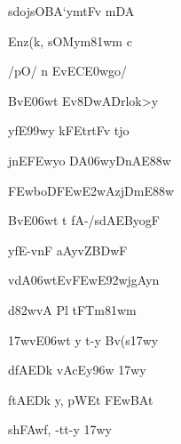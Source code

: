 \ujvers\dnnemsloka 
{\dn sdojsOBA`ymtFv m\?DA}
\dontdisplaylinenum

\dnnemslokab 
{\dn Enz(k, sOMym\381wm\2 c \dandadn\dontdisplaylinenum}

\dnnemslokac 
{\dn {}/pO/\2 n EvEC\3E0wgo/}
\dontdisplaylinenum

\dnnemslokad 
{\dn BvE\306wt Ev\38DwADrlok>y \vegdn\dontdisplaylinenum}


\ujvers\dnnemsloka 
{\dn yfE\399wy\2 kFEt\0rtFv t\?jo}
\dontdisplaylinenum

\dnnemslokab 
{\dn jnE\3FEwyo DA\306wyDnAE\388w \dandadn\dontdisplaylinenum}

\dnnemslokac 
{\dn \3FEwboD\3FEw\3E2wAzjDm\0E\388w}
\dontdisplaylinenum

\dnnemslokad 
{\dn BvE\306wt t\2 fA-/sdAEByogF \vegdn\dontdisplaylinenum}


\ujvers\dnnemsloka 
{\dn yfE-vnF aAy\0vZ\0\3BDwF}
\dontdisplaylinenum

\dnnemslokab 
{\dn v\?dA\306wtEv\3FEwE\392wjgAyn\? \dandadn\dontdisplaylinenum}

\dnnemslokac 
{\dn d\382wvA Pl\2 tFT\0m\381wm\?}
\dontdisplaylinenum

\dnnemslokad 
{\dn {}\317wvE\306wt y\? t-y Bv\?(s\317wy \vegdn\dontdisplaylinenum}


\ujvers\dnnemsloka 
{\dn dfAEDk\2 vAcEy\396w \317wy}
\dontdisplaylinenum

\dnnemslokab 
{\dn ftAEDk\2 y, pWEt \3FEwBAt\? \dandadn\dontdisplaylinenum}

\dnnemslokac 
{\dn sh\3FAwf, -tt-y \317wy}
\dontdisplaylinenum

